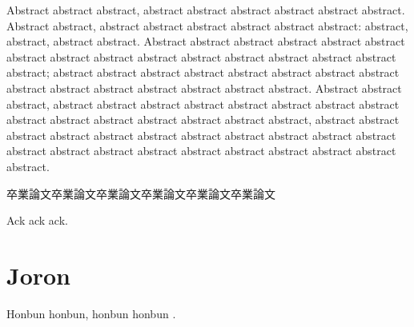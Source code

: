\documentclass[senior,final,11pt]{iscs-thesis}
\date{February XX, 20XX}
\begin{document}
\begin{eabstract}
Abstract abstract abstract, 
abstract abstract abstract abstract abstract abstract. 
Abstract abstract, abstract abstract abstract abstract abstract abstract: 
abstract, abstract, abstract abstract. 
Abstract abstract abstract abstract abstract abstract abstract 
abstract abstract abstract abstract abstract abstract abstract 
abstract abstract; 
abstract abstract abstract abstract abstract abstract abstract abstract
abstract abstract abstract abstract abstract abstract abstract. 
Abstract abstract abstract, 
abstract abstract abstract abstract abstract abstract abstract abstract
abstract abstract abstract abstract abstract abstract abstract, 
abstract abstract abstract abstract abstract abstract abstract abstract
abstract abstract abstract abstract abstract abstract abstract 
abstract abstract abstract abstract abstract abstract. 
\end{eabstract}
\begin{jabstract}
卒業論文卒業論文卒業論文卒業論文卒業論文卒業論文
\end{jabstract}
\maketitle

\begin{acknowledge}
Ack ack ack. 
\end{acknowledge}

\frontmatter 
\tableofcontents
\mainmatter

\chapter{Joron}

Honbun honbun, honbun honbun
\cite{4065825}. 



\end{document}
